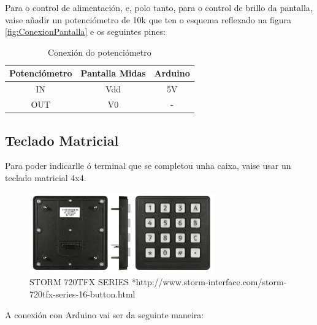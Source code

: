 \documentclass[11pt,twoside]{book}
\begin{document}
Para o control de alimentación, e, polo tanto, para o control de brillo da pantalla, vaise añadir un potenciómetro de 10k que ten o esquema reflexado na figura \ref{fig:ConexionPantalla} e os seguintes pines:

\begin{table}[htbt]
\begin{center}
\begin{tabular}{|c|c|c|}
\hline
Potenciómetro & Pantalla Midas & Arduino\\
\hline
IN & Vdd & 5V \\
\hline
OUT & V0 & -\\
\hline
\end{tabular}
\caption{Conexión do potenciómetro}
\label{TablaPotenciometro}
\end{center}
\end{table}

\subsection{Teclado Matricial}

Para poder indicarlle ó terminal que se completou unha caixa, vaise usar un teclado matricial 4x4.

\begin{figure}[H]
	\begin{center}
		\includegraphics[width=8cm]{images/teclado_storm.jpg}
	\end{center}
	\caption{STORM 720TFX SERIES *http://www.storm-interface.com/storm-720tfx-series-16-button.html}
	\label{fig:TecladoStorm}
\end{figure}

A conexión con Arduino vai ser da seguinte maneira:
\end{document}
